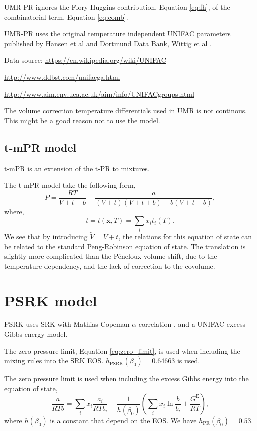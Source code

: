 \documentclass[internal,english]{sintefmemo2012}
\newcommand*{\vektor}[1]{\boldsymbol{#1}}%
\newcommand{\excess}{\text{E}\xspace}
\begin{document}
UMR-PR ignores the Flory-Huggins contribution, Equation \ref{eq:fh},
of the combinatorial term, Equation \ref{eq:comb}.

UMR-PR uses the original temperature independent UNIFAC parameters published by Hansen et al \cite{Hansen1991} and Dortmund Data Bank, Wittig et al \cite{Wittig2003}.

Data source:
\url{https://en.wikipedia.org/wiki/UNIFAC}

\url{http://www.ddbst.com/unifacga.html}

\url{http://www.aim.env.uea.ac.uk/aim/info/UNIFACgroups.html}

The volume correction temperature differentials used in UMR is not
continous. This might be a good reason not to use the model.


\subsection{t-mPR model}
t-mPR \cite{Avlonitis1994} is an extension of the t-PR
\cite{Magoulas1990} to mixtures.

The t-mPR model take the following form,
\begin{equation}
  \label{eq:t-mPR}
  P = \frac{RT}{V+t-b} - \frac{a}{(V+t)(V+t+b) + b(V+t-b)},
\end{equation}
where,
\begin{equation}
  \label{eq:tmix}
  t = t(\vektor{x},T) = \underset{i}{\sum} x_i t_i(T).
\end{equation}
We see that by introducing $\tilde{V} = V + t$, the relations for this
equation of state can be related to the standard Peng-Robinson
equation of state. The translation is slightly more complicated than
the P{\'e}neloux \cite{Peneloux1982} volume shift, due to the
temperature dependency, and the lack of correction to the covolume.

\section{PSRK model}
PSRK \cite{Holderbaum1991} uses SRK with Mathias-Copeman
$\alpha$-correlation \cite{Mathias1983}, and a UNIFAC excess Gibbs
energy model. 

The zero pressure limit, Equation \ref{eq:zero_limit},
is used when including the mixing rules into the SRK EOS.
$h_{\text{PSRK}}(\beta_0) = 0.64663$ is used.

The zero pressure limit is used when including the excess Gibbs energy into the equation of state,
\begin{equation}
  \label{eq:zero_limit}
  \frac{a}{RTb} = \underset{i}{\sum} x_i \frac{a_i}{RTb_i} - \frac{1}{h(\beta_0)}\left(\underset{i}{\sum} x_i \ln \frac{b}{b_i} + \frac{G^\excess}{RT} \right),
\end{equation}
where $h(\beta_0)$ is a constant that depend on the EOS. We have $h_{\text{PR}}(\beta_0) = 0.53$.
\end{document}
